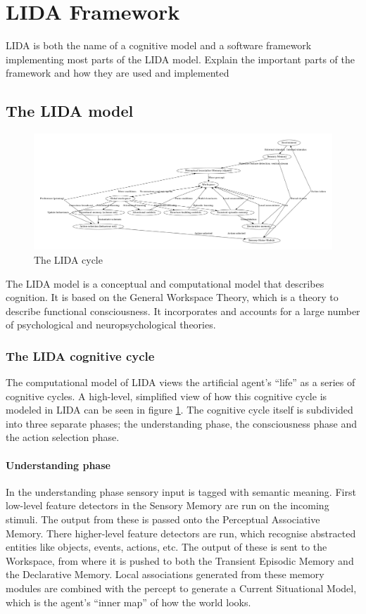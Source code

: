 \section{LIDA Framework}
\label{sec:lida}
LIDA is both the name of a cognitive model and a software framework implementing
most parts of the LIDA model.
Explain the important parts of the framework and how they are used and implemented

\subsection{The LIDA model}
\begin{figure}[h!tb]
\centering
\includegraphics[angle=90, height=0.85\textheight]{graphics/lida-cycle.pdf}
\caption{The LIDA cycle}
\label{fig:lida-cycle}
\end{figure}
The LIDA model is a conceptual and computational model that describes cognition.
It is based on the General Workspace Theory, which is a theory to describe
functional consciousness. It incorporates and accounts for a large number of
psychological and neuropsychological theories.

\subsubsection{The LIDA cognitive cycle}
The computational model of LIDA views the artificial agent's ``life'' as a
series of cognitive cycles. A high-level, simplified view of how this cognitive
cycle is modeled in LIDA can be seen in figure \ref{fig:lida-cycle}.
The cognitive cycle itself is subdivided into three separate phases; the
understanding phase, the consciousness phase and the action selection phase.
\paragraph{Understanding phase}
In the understanding phase sensory input is tagged with semantic meaning. First low-level feature detectors in the Sensory Memory are run on the incoming stimuli. The output from these is passed onto the Perceptual Associative Memory. There higher-level feature detectors are run, which recognise abstracted entities like objects, events, actions, etc. The output of these is sent to the Workspace, from where it is pushed to both the Transient Episodic Memory and the Declarative Memory. Local associations generated from these memory modules are combined with the percept to generate a Current Situational Model, which is the agent's ``inner map'' of how the world looks.
